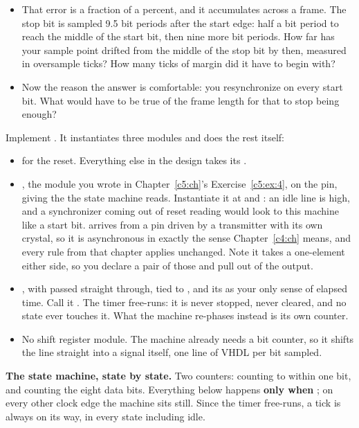 \begin{parts}
\begin{itemize}
        there are two candidates either side of it: work out the error each one leaves, and say
        which the default above is and why.
      \item That error is a fraction of a percent, and it accumulates across a frame. The stop bit
        is sampled 9.5 bit periods after the start edge: half a bit period to reach the middle of
        the start bit, then nine more bit periods. How far has your sample point drifted from the
        middle of the stop bit by then, measured in oversample ticks? How many ticks of margin did
        it have to begin with?
      \item Now the reason the answer is comfortable: you resynchronize on every start bit. What
        would have to be true of the frame length for that to stop being enough?
    \end{itemize}
  \item Implement . It instantiates three modules and does the rest itself:
    \begin{itemize}
      \item {} for the reset. Everything else in the design takes its
        .
      \item \textbf{}, the module you wrote in Chapter~\ref{c5:ch}'s
        Exercise~\ref{c5:ex:4}, on the  pin, giving the  the state machine
        reads. Instantiate it at  and : an idle line is high,
        and a synchronizer coming out of reset reading  would look to this machine like a
        start bit.  arrives from a pin driven by a transmitter with its own crystal, so it
        is asynchronous in exactly the sense Chapter~\ref{c4:ch} means, and every rule from that
        chapter applies unchanged. Note it takes a one-element  either
        side, so you declare a pair of those and pull  out of the output.
      \item {}, with  passed straight through, 
        tied to , and its  as your only sense of elapsed time. Call it
        . The timer free-runs: it is never stopped, never cleared, and no state ever
        touches it. What the machine re-phases instead is its own  counter.
      \item No shift register module. The machine already needs a bit counter, so it shifts the
        line straight into a  signal itself, one line of VHDL per bit sampled.
    \end{itemize}
    \textbf{The state machine, state by state.} Two counters:  counting  to
     within one bit, and  counting the eight data bits. Everything below
    happens \textbf{only when }; on every other clock edge the machine sits
    still. Since the timer free-runs, a tick is always on its way, in every state including idle.


\end{parts}
